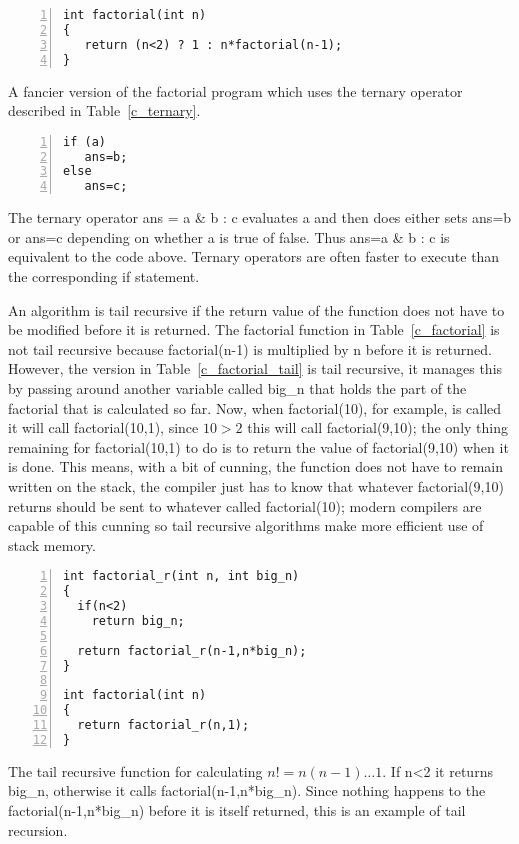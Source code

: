 \documentclass[11pt,a4paper]{scrartcl}
\begin{document}
\begin{table}
\begin{lstlisting}[numbers=left]
int factorial(int n)
{
   return (n<2) ? 1 : n*factorial(n-1);
}

\end{lstlisting}
\caption{A fancier version of the factorial program which uses the ternary operator described in Table~\ref{c_ternary}.\label{c_factorial_fancy}}
\end{table}


\begin{table}
\begin{lstlisting}[numbers=left]
if (a)
   ans=b;
else 
   ans=c;
\end{lstlisting}
\caption{The ternary operator ans = a \& b : c evaluates a and then
  does either sets ans=b or ans=c depending on whether a is true of
  false.  Thus ans=a \& b : c is equivalent to the code above. Ternary
  operators are often faster to execute than the corresponding if
  statement.\label{c_ternary}}
\end{table}

An algorithm is tail recursive if the return value of the function
does not have to be modified before it is returned. The factorial
function in Table~\ref{c_factorial} is not tail recursive because
factorial(n-1) is multiplied by n before it is returned. However, the
version in Table~\ref{c_factorial_tail} is tail recursive, it manages
this by passing around another variable called big\_n that holds the
part of the factorial that is calculated so far. Now, when
factorial(10), for example, is called it will call factorial(10,1),
since $10>2$ this will call factorial(9,10); the only thing remaining
for factorial(10,1) to do is to return the value of factorial(9,10)
when it is done. This means, with a bit of cunning, the function does
not have to remain written on the stack, the compiler just has to know
that whatever factorial(9,10) returns should be sent to whatever
called factorial(10); modern compilers are capable of this cunning so
tail recursive algorithms make more efficient use of stack memory.

\begin{table}
\begin{lstlisting}[numbers=left]
int factorial_r(int n, int big_n)
{
  if(n<2)
    return big_n;

  return factorial_r(n-1,n*big_n);
}

int factorial(int n)
{
  return factorial_r(n,1);
}
\end{lstlisting}
\caption{The tail recursive function for calculating $n!=n(n-1)\ldots
  1$. If n<2 it returns big\_n, otherwise it calls
  factorial(n-1,n*big\_n). Since nothing happens to the
  factorial(n-1,n*big\_n) before it is itself returned, this is an
  example of tail recursion.\label{c_factorial_tail}}
\end{table}
\end{document}
